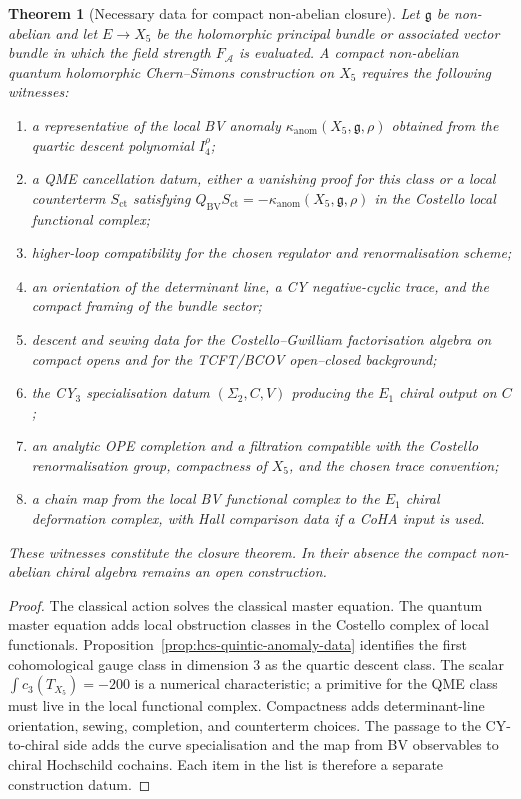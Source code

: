 \documentclass[11pt]{amsart}
\newtheorem{theorem}{Theorem}
\providecommand{\kanom}{\kappa_{\mathrm{anom}}}
\providecommand{\fg}{\mathfrak{g}}
\providecommand{\cA}{\mathcal{A}}
\begin{document}
\begin{theorem}[Necessary data for compact non-abelian closure]
\label{thm:hcs-quintic-necessary-data}
Let $\fg$ be non-abelian and let $E\to X_5$ be the holomorphic
principal bundle or associated vector bundle in which the field
strength $F_\cA$ is evaluated. A compact non-abelian quantum
holomorphic Chern--Simons construction on $X_5$ requires the following
witnesses:
\begin{enumerate}
\item a representative of the local BV anomaly
$\kanom(X_5,\fg,\rho)$ obtained from the quartic descent polynomial
$I_4^\rho$;
\item a QME cancellation datum, either a vanishing proof for this class
or a local counterterm $S_{\mathrm{ct}}$ satisfying
$Q_{\mathrm{BV}}S_{\mathrm{ct}}=-\kanom(X_5,\fg,\rho)$ in the
Costello local functional complex;
\item higher-loop compatibility for the chosen regulator and
renormalisation scheme;
\item an orientation of the determinant line, a CY negative-cyclic
trace, and the compact framing of the bundle sector;
\item descent and sewing data for the Costello--Gwilliam factorisation
algebra on compact opens and for the TCFT/BCOV open--closed background;
\item the CY$_3$ specialisation datum $(\Sigma_2,C,V)$ producing the
$E_1$ chiral output on $C$;
\item an analytic OPE completion and a filtration compatible with the
Costello renormalisation group, compactness of $X_5$, and the chosen
trace convention;
\item a chain map from the local BV functional complex to the
$E_1$ chiral deformation complex, with Hall comparison data if a
CoHA input is used.
\end{enumerate}
These witnesses constitute the closure theorem. In their absence the
compact non-abelian chiral algebra remains an open construction.
\end{theorem}

\begin{proof}
The classical action solves the classical master equation. The quantum
master equation adds local obstruction classes in the Costello complex
of local functionals. Proposition~\ref{prop:hcs-quintic-anomaly-data}
identifies the first cohomological gauge class in dimension $3$ as the
quartic descent class. The scalar $\int c_3(T_{X_5})=-200$ is a
numerical characteristic; a primitive for the QME class must live in the
local functional complex. Compactness adds determinant-line
orientation, sewing, completion, and counterterm choices. The passage
to the CY-to-chiral side adds the curve specialisation and the map from
BV observables to chiral Hochschild cochains. Each item in the list is
therefore a separate construction datum.
\end{proof}
\end{document}
